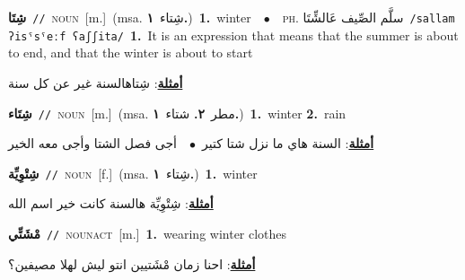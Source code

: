 \documentclass[10pt,a4paper,twoside]{article} %
\begin{document}
\begin{multicols}{2}
{\setlength\topsep{0pt}\textbf{\foreignlanguage{arabic}{شِتَا}}\ {\color{gray}\texttt{//}\color{black}}\ \textsc{noun}\ [m.]\ \color{gray}(msa. \foreignlanguage{arabic}{شِتاء}~\foreignlanguage{arabic}{\textbf{١.}})\color{black}\ \textbf{1.}~winter\ \ $\bullet$\ \ \textsc{ph.} \color{gray} \foreignlanguage{arabic}{سلَّم الصِّيف عَالشِّتَا}\color{black}\ {\color{gray}\texttt{/{\sffamily sallam ʔisˤsˤeːf ʕaʃʃita}/}\color{black}}\ \textbf{1.}~It is an expression that means that the summer is about to end, and that the winter is about to start\  \begin{flushright}\color{gray}\foreignlanguage{arabic}{\textbf{\underline{\foreignlanguage{arabic}{أمثلة}}}: شِتاهالسنة غير عن كل سنة}\end{flushright}\color{black}} \vspace{2mm}

{\setlength\topsep{0pt}\textbf{\foreignlanguage{arabic}{شِتَاء}}\ {\color{gray}\texttt{//}\color{black}}\ \textsc{noun}\ [m.]\ \color{gray}(msa. \foreignlanguage{arabic}{مطر}~\foreignlanguage{arabic}{\textbf{٢.}}  \foreignlanguage{arabic}{شتاء}~\foreignlanguage{arabic}{\textbf{١.}})\color{black}\ \textbf{1.}~winter  \textbf{2.}~rain\  \begin{flushright}\color{gray}\foreignlanguage{arabic}{\textbf{\underline{\foreignlanguage{arabic}{أمثلة}}}: السنة هاي ما نزل شتا كتير\ $\bullet$\ \  أجى فصل الشتا وأجى معه الخير}\end{flushright}\color{black}} \vspace{2mm}

{\setlength\topsep{0pt}\textbf{\foreignlanguage{arabic}{شِتْوِيِّة}}\ {\color{gray}\texttt{//}\color{black}}\ \textsc{noun}\ [f.]\ \color{gray}(msa. \foreignlanguage{arabic}{شِتاء}~\foreignlanguage{arabic}{\textbf{١.}})\color{black}\ \textbf{1.}~winter\  \begin{flushright}\color{gray}\foreignlanguage{arabic}{\textbf{\underline{\foreignlanguage{arabic}{أمثلة}}}: شِتْوِيِّة هالسنة كانت خير اسم الله}\end{flushright}\color{black}} \vspace{2mm}

{\setlength\topsep{0pt}\textbf{\foreignlanguage{arabic}{مْشَتِّي}}\ {\color{gray}\texttt{//}\color{black}}\ \textsc{noun\textunderscore act}\ [m.]\ \textbf{1.}~wearing winter clothes\  \begin{flushright}\color{gray}\foreignlanguage{arabic}{\textbf{\underline{\foreignlanguage{arabic}{أمثلة}}}: احنا زمان مْشَتيين انتو ليش لهلا مصيفين؟}\end{flushright}\color{black}} \vspace{2mm}


\end{multicols}
\end{document}
